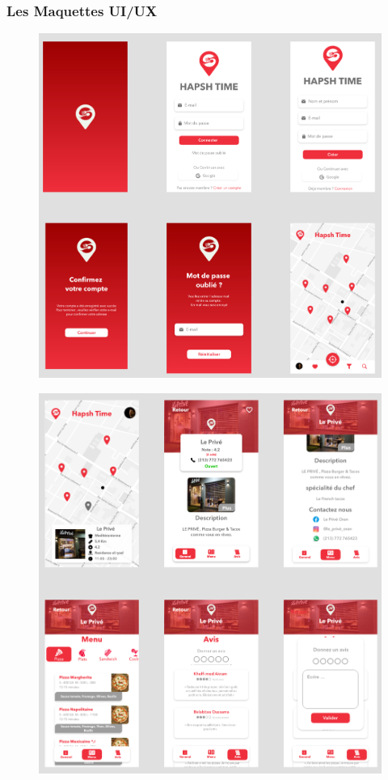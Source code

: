 \subsubsection{Les Maquettes UI/UX}
\begin{figure}[!h]

    \centering
    \includegraphics[width=6.5in]{images/Chapitre3/maquettes_balsamiq/p1.jpg}
    \label{fig:ux1}
   
\end{figure}
\newpage
\begin{figure}[!h]

    \centering
    \includegraphics[width=6.5in]{images/Chapitre3/maquettes_balsamiq/p2.jpg}
    \label{fig:ux2}
   
\end{figure}
